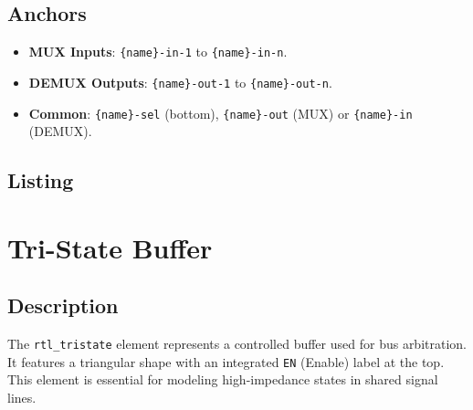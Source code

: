     \subsection{\sffamily Anchors}
        \begin{itemize}
            \item \textbf{MUX Inputs}: \texttt{\{name\}-in-1} to \texttt{\{name\}-in-n}.
            \item \textbf{DEMUX Outputs}: \texttt{\{name\}-out-1} to \texttt{\{name\}-out-n}.
            \item \textbf{Common}: \texttt{\{name\}-sel} (bottom), \texttt{\{name\}-out} (MUX) or \texttt{\{name\}-in} (DEMUX).
        \end{itemize}

    \subsection{\sffamily Listing}
\begin{RTLexample}
\end{RTLexample}

\section{\sffamily Tri-State Buffer}

    \subsection{\sffamily Description}
        The \texttt{rtl\_tristate} element represents a controlled buffer used for bus arbitration. It features a triangular shape with an integrated \texttt{EN} (Enable) label at the top. This element is essential for modeling high-impedance states in shared signal lines.

